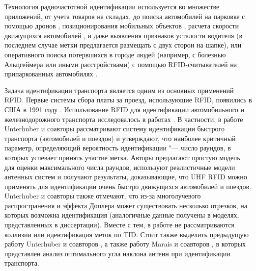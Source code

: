 Технология радиочастотной идентификации \cite{Finkenzeller2010, Dobkin2008} используется во множестве приложений, от учета товаров на складах, до поиска автомобилей на парковке с помощью дронов \cite{Wu2019}, позиционирования мобильных объектов \cite{Cho2013, Park2013, Errington2010}, расчета скорости движущихся автомобилей \cite{Zhai2018, Choy2020, Jing2013}, и даже выявления признаков усталости водителя \cite{Yang2020} (в последнем случае метки предлагается размещать с двух сторон на шапке), или оперативного поиска потервшихся в городе людей (например, с болезнью Альцгеймера или иными расстройствами) с помощью RFID-считывателей на припаркованных автомобилях \cite{Griggs2018}.

Задача идентификации транспорта является одним из основных применений RFID. Первые системы сбора платы за проезд, использующие RFID, появились в США в 1991 году \cite{Landt2005}. Использование RFID для идентификации автомобильного и железнодорожного транспорта исследовалось в работах \cite{Gonzalez2013, Blythe1999, Khan2011, Yoon2008, Al-Naima2011, Tseng2007, Kostrominov2020, Unterhuber2019, Unterhuber2020, Unterhuber2019, Pawowicz2020, Choy2020, Jo2009, Zhang2010, MenesesGonzalez2011, Lonkar2018, Balbin2017, Bhavke2017, Zhang2011, Zhang2010a, Pandit2009, Sundar2015}. В частности, в работе \cite{Unterhuber2020} Unterhuber и соавторы рассматривают систему идентификации быстрого транспорта (автомобилей и поездов) и утверждают, что наиболее критичный параметр, определяющий вероятность идентификации "--- число раундов, в которых успевает принять участие метка. Авторы предлагают простую модель для оценки максимального числа раундов, используют реалистичные модели антенных систем и получают результаты, доказывающие, что UHF RFID можно применять для идентификации очень быстро движущихся автомобилей и поездов. Unterhuber и соавторы также отмечают, что из-за многолучевого распространения и эффекта Доплера может существовать несколько отрезков, на которых возможна идентификация (аналогичные данные получены в моделях, представленных в диссертации). Вместе с тем, в работе \cite{Unterhuber2020} не рассматриваются коллизии или идентификация меток по TID. Стоит также выделить предыдущую работу Unterhuber и соавторов \cite{Unterhuber2019}, а также работу Marais и соавторов \cite{Marais2013}, в которых представлен анализ оптимального угла наклона антенн при идентификации транспорта. 

